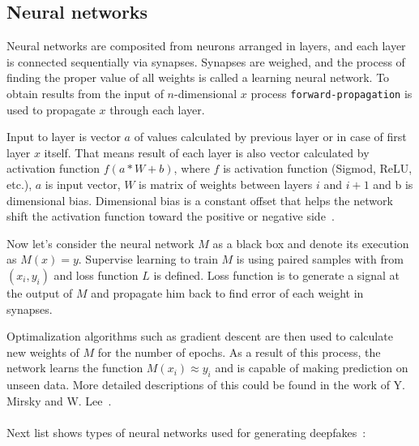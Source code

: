 \subsection{Neural networks}

Neural networks are composited from neurons arranged in layers, and each layer is connected sequentially via synapses. Synapses are weighed, and the process of finding the proper value of all weights is called a learning neural network. To obtain results from the input of \(n\)-dimensional \(x\) process \texttt{forward-propagation} is used to propagate \(x\) through each layer.~\cite{CreationandDetectionofDeepfakes}

Input to layer is vector \(a\) of values calculated by previous layer or in case of first layer \(x\) itself. That means result of each layer is also vector calculated by activation function \(f(a*W+b)\), where \(f\) is activation function (Sigmod, ReLU, etc.), \(a\) is input vector, \(W\) is matrix of weights between layers \(i\) and \(i+1\) and b is dimensional bias. Dimensional bias is a constant offset that helps the network shift the activation function toward the positive or negative side~\cite{NeuralNetworkBias}.~\cite{CreationandDetectionofDeepfakes}

Now let’s consider the neural network \(M\) as a black box and denote its execution as \(M(x) = y\). Supervise learning to train \(M\) is using paired samples with from \((x_i, y_i)\) and loss function \(L\) is defined. Loss function is to generate a signal at the output of \(M\) and propagate him back to find error of each weight in synapses.~\cite{CreationandDetectionofDeepfakes}

Optimalization algorithms such as gradient descent are then used to calculate new weights of \(M\) for the number of epochs. As a result of this process, the network learns the function \(M(x_i) \approx y_i\) and is capable of making prediction on unseen data. More detailed descriptions of this could be found in the work of Y. Mirsky and W. Lee~\cite{CreationandDetectionofDeepfakes}.~\cite{CreationandDetectionofDeepfakes}
\\\\
Next list shows types of neural networks used for generating deepfakes~\cite{CreationandDetectionofDeepfakes}:

